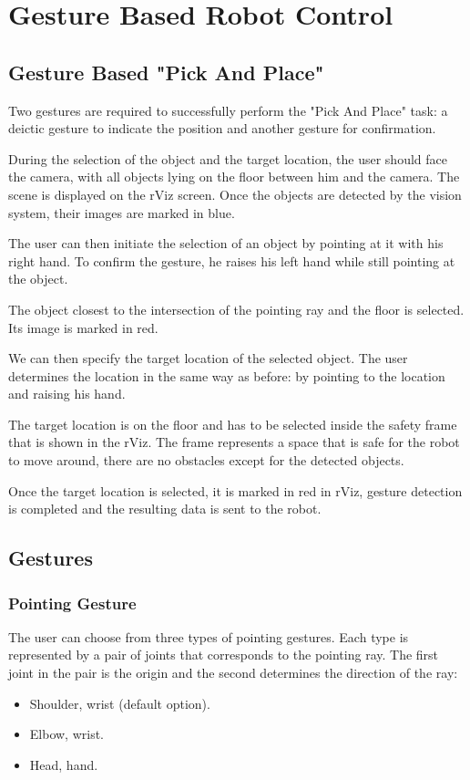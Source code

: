 \chapter{Gesture Based Robot Control}

\section{Gesture Based "Pick And Place"}
Two gestures are required to successfully perform the "Pick And Place" task:
a deictic gesture to indicate the position and another gesture for confirmation.\par
During the selection of the object and the target location, the user should face the camera, with all objects lying on the floor between him and the camera. The scene is displayed on the rViz screen. Once the objects are detected by the vision system, their images are marked in blue.\par
The user can then initiate the selection of an object by pointing at it with his right hand. To confirm the gesture, he raises his left hand while still pointing at the object.\par
The object closest to the intersection of the pointing ray and the floor is selected. Its image is marked in red.\par
We can then specify the target location of the selected object. The user determines the location in the same way as before: by pointing to the location and raising his hand.\par
The target location is on the floor and  has to be selected inside the safety frame that is shown in the rViz. The frame represents a space that is safe for the robot to move around, there are no obstacles except for the detected objects.\par
Once the target location is selected, it is marked in red in rViz, gesture detection is completed and the resulting data is sent to the robot.\par

\section{Gestures}

\subsection{Pointing Gesture}
The user can choose from three types of pointing gestures. Each type is represented by a pair of joints that corresponds to the pointing ray. The first joint in the pair is the origin and the second determines the direction of the ray:\par
\begin{itemize}
	\item Shoulder, wrist (default option).
    \item Elbow, wrist.
    \item Head, hand.
\end{itemize}

